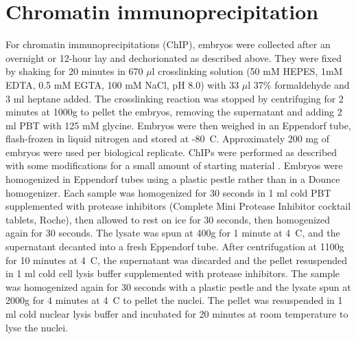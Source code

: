 \section{Chromatin immunoprecipitation}
For chromatin immunoprecipitations (ChIP), embryos were collected after an overnight or 12-hour lay and dechorionated as described above. They were fixed by shaking for 20 minutes in 670 \(\mu\)l crosslinking solution (50 mM HEPES, 1mM EDTA, 0.5 mM EGTA, 100 mM NaCl, pH 8.0) with 33 \(\mu\)l 37\% formaldehyde and 3 ml heptane added. The crosslinking reaction was stopped by centrifuging for 2 minutes at 1000g to pellet the embryos, removing the supernatant and adding 2 ml PBT with 125 mM glycine. Embryos were then weighed in an Eppendorf tube, flash-frozen in liquid nitrogen and stored at -80\degree~C. Approximately 200 mg of embryos were used per biological replicate. ChIPs were performed as described with some modifications for a small amount of starting material \citep{ghavi-helm_analyzing_2012, sandmann_chip--chip_2007}. Embryos were homogenized in Eppendorf tubes using a plastic pestle rather than in a Dounce homogenizer. Each sample was homogenized for 30 seconds in 1 ml cold PBT supplemented with protease inhibitors (Complete Mini Protease Inhibitor cocktail tablets, Roche), then allowed to rest on ice for 30 seconds, then homogenized again for 30 seconds. The lysate was spun at 400g for 1 minute at 4\degree~C, and the supernatant decanted into a fresh Eppendorf tube. After centrifugation at 1100g for 10 minutes at 4\degree~C, the supernatant was discarded and the pellet resuspended in 1 ml cold cell lysis buffer supplemented with protease inhibitors. The sample was homogenized again for 30 seconds with a plastic pestle and the lysate spun at 2000g for 4 minutes at 4\degree~C to pellet the nuclei. The pellet was resuspended in 1 ml cold nuclear lysis buffer and incubated for 20 minutes at room temperature to lyse the nuclei.

